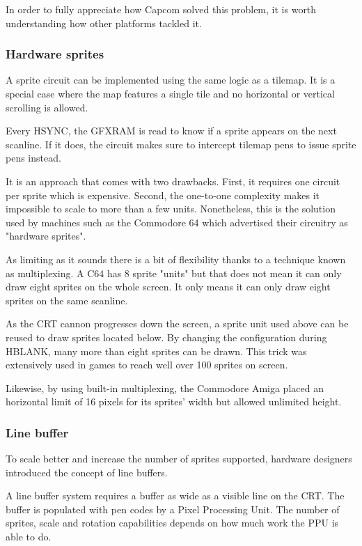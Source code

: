 In order to fully appreciate how Capcom solved this problem, it is worth understanding how other platforms tackled it.

\subsubsection{Hardware sprites}
A sprite circuit can be implemented using the same logic as a tilemap. It is a special case where the map features a single tile and no  horizontal or vertical scrolling is allowed.

Every HSYNC, the GFXRAM is read to know if a sprite appears on the next scanline. If it does, the circuit makes sure to intercept tilemap pens to issue sprite pens instead. 

It is an approach that comes with two drawbacks. First, it requires one circuit per sprite which is expensive. Second, the one-to-one complexity makes it impossible to scale to more than a few units. Nonetheless, this is the solution used by machines such as the Commodore 64 which advertised their circuitry as "hardware sprites".


As limiting as it sounds there is a bit of flexibility thanks to a technique known as multiplexing. A C64 has 8 sprite "units" but that does not mean it can only draw eight sprites on the whole screen. It only means it can only draw eight sprites on the same scanline.

As the CRT cannon progresses down the screen, a sprite unit used above can be reused to draw sprites located below. By changing the configuration during HBLANK, many more than eight sprites can be drawn. This trick was extensively used in games to reach well over 100 sprites on screen.


Likewise, by using built-in multiplexing, the Commodore Amiga placed an horizontal limit of 16 pixels for its sprites' width but allowed unlimited height.

\subsubsection{Line buffer}
To scale better and increase the number of sprites supported, hardware designers introduced the concept of line buffers. 

A line buffer system requires a buffer as wide as a visible line on the CRT. The buffer is populated with pen codes by a Pixel Processing Unit. The number of sprites, scale and rotation capabilities depends on how much work the PPU is able to do. 

